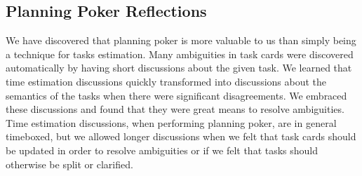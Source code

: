 \subsection{Planning Poker Reflections}
We have discovered that planning poker is more valuable to us than simply being a technique for tasks estimation. Many ambiguities in task cards were discovered automatically by having short discussions about the given task. We learned that time estimation discussions quickly transformed into discussions about the semantics of the tasks when there were significant disagreements. We embraced these discussions and found that they were great means to resolve ambiguities. Time estimation discussions, when performing planning poker, are in general timeboxed, but we allowed longer discussions when we felt that task cards should be updated in order to resolve ambiguities or if we felt that tasks should otherwise be split or clarified.
